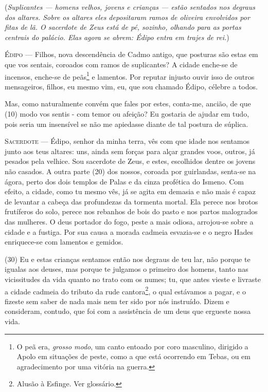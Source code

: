 (\emph{Suplicantes --- homens velhos, jovens e crianças --- estão sentados
nos degraus dos altares. Sobre os altares eles depositaram ramos de
oliveira envolvidos por fitas de lã. O sacerdote de Zeus está de pé,
sozinho, olhando para as portas centrais do palácio. Elas agora se
abrem: Édipo entra em trajes de rei.})

\textsc{Édipo} --- Filhos, nova descendência de Cadmo antigo, que posturas são estas em que
vos sentais, coroados com ramos de suplicantes? A cidade enche-se de
incensos, enche-se de peãs\footnote{O peã era, \emph{grosso modo}, um 
canto entoado por coro masculino, dirigido a Apolo em situações de 
peste, como a que está ocorrendo em Tebas, ou em agradecimento por uma 
vitória na guerra.} e lamentos. Por reputar injusto ouvir isso de 
outros mensageiros, filhos, eu mesmo vim, eu, que sou chamado Édipo, 
célebre a todos.

Mas, como naturalmente convém que fales por estes, conta-me, ancião, de
que (10) modo vos sentis - com temor ou afeição? Eu gostaria de ajudar
em tudo, pois seria um insensível se não me apiedasse diante de tal
postura de súplica.

\textsc{Sacerdote} --- Édipo, senhor da minha terra, vês com que idade nos sentamos junto aos
teus altares: uns, ainda sem forças para alçar grandes voos, outros, já
pesados pela velhice. Sou sacerdote de Zeus, e estes, escolhidos dentre
os jovens não casados. A outra parte (20) dos nossos, coroada por
guirlandas, senta-se na ágora, perto dos dois templos de Palas e da
cinza profética do Ismeno. Com efeito, a cidade, como tu mesmo vês, já
se agita em demasia e não mais é capaz de levantar a cabeça das
profundezas da tormenta mortal. Ela perece nos brotos frutíferos do
solo, perece nos rebanhos de bois do pasto e nos partos malogrados das
mulheres. O deus portador do fogo, peste a mais odiosa, arrojou-se sobre
a cidade e a fustiga. Por sua causa a morada cadmeia esvazia-se e o
negro Hades enriquece-se com lamentos e gemidos.

(30) Eu e estas crianças sentamos então nos degraus de teu lar, não
porque te igualas aos deuses, mas porque te julgamos o primeiro dos
homens, tanto nas vicissitudes da vida quanto no trato com os numes; tu,
que antes vieste e livraste a cidade cadmeia do tributo da rude
cantora\footnote{Alusão à Esfinge. Ver glossário.}, o qual estávamos a
pagar, e o fizeste sem saber de nada mais nem ter sido por nós
instruído. Dizem e consideram, contudo, que foi com a assistência de um
deus que ergueste nossa vida.

